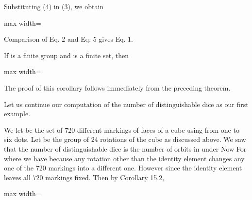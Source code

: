 \documentclass[11pt,oneside]{article}
\begin{document}
\begin{BookBody}
\noindent Substituting (4) in (3), we obtain

\begin{center}\begin{adjustbox}{max width=\linewidth}\end{adjustbox}\end{center}

\noindent Comparison of Eq. 2 and Eq. 5 gives Eq. 1. \BookEnd{\blacklozenge}

\end{BookBody}

\BookNarrativetrue

\begin{BookBody}

 If  is a finite group and  is a finite set, then

\begin{center}\begin{adjustbox}{max width=\linewidth}\end{adjustbox}\end{center}

 The proof of this corollary follows immediately from the preceding theorem. \BookEnd{\blacklozenge}

Let us continue our computation of the number of distinguishable dice as our first example.

 We let  be the set of 720 different markings of faces of a cube using from one to six dots. Let  be the group of 24 rotations of the cube as discussed above. We saw that the number of distinguishable dice is the number of orbits in  under  Now  For  where  we have  because any rotation other than the identity element changes any one of the 720 markings into a different one. However since the identity element leaves all 720 markings fixed. Then by Corollary 15.2,

\begin{center}\begin{adjustbox}{max width=\linewidth}\end{adjustbox}\end{center}


\end{BookBody}
\end{document}
